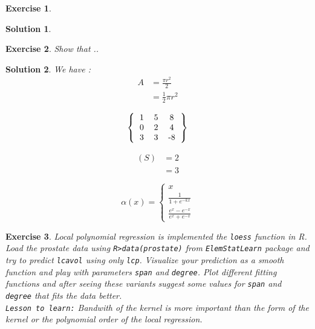 \documentclass[12pt,a4paper]{article}
\newtheorem{exercise}{Exercise}
\newtheorem{solution}{Solution}
\begin{document}
\begin{exercise}

\end{exercise}
\begin{solution}

\end{solution}

\begin{exercise}
Show that ..
\end{exercise}
\begin{solution}
We have : \\

\begin{equation}
\begin{split}
A & = \frac{\pi r^2}{2} \\
 & = \frac{1}{2} \pi r^2
\end{split}
\end{equation}



\[ 
\left \{
  \begin{tabular}{ccc}
  1 & 5 & 8 \\
  0 & 2 & 4 \\
  3 & 3 & -8 
  \end{tabular}
\right \}
\]

\begin{equation}
\begin{split}
(S) & = 2 \\
	& = 3
\end{split}
\end{equation}

\[\alpha(x)=\begin{cases}
               x\\
               \frac{1}{1+e^{-kx}}\\
               \frac{e^x-e^{-x}}{e^x+e^{-x}}
            \end{cases}\]

\end{solution}

\begin{exercise}
Local polynomial regression is implemented the \texttt{loess} function in R. Load the prostate data using \texttt{R>data(prostate)} from \texttt{ElemStatLearn} package and try to predict \texttt{lcavol} using only \texttt{lcp}. Visualize your prediction as a smooth function and play with parameters \texttt{span} and \texttt{degree}. Plot different fitting functions and after seeing these variants suggest some values for \texttt{span} and \texttt{degree} that fits the data better.\\
\vspace{0.2in}
{ \texttt{Lesson to learn:} Bandwith of the kernel is more important than the form of the kernel or the polynomial order of the local regression.}
\end{exercise}
\end{document}
